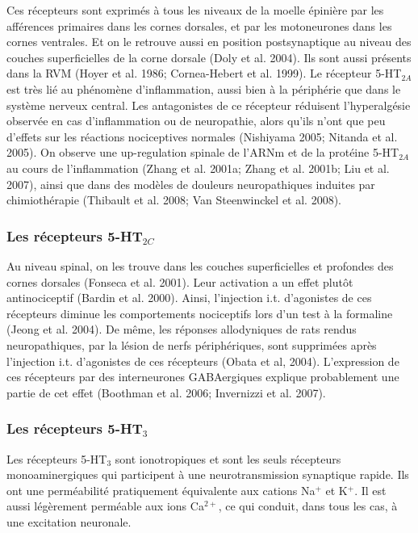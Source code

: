 \documentclass[a4paper,12pt,twoside]{report}
\begin{document}
Ces récepteurs sont exprimés à tous les niveaux de la moelle épinière par les afférences primaires dans les cornes dorsales, et par les motoneurones dans les cornes ventrales. Et on le retrouve aussi en position postsynaptique au niveau des couches superficielles de la corne dorsale (Doly et al. 2004). Ils sont aussi présents dans la RVM (Hoyer et al. 1986; Cornea-Hebert et al. 1999). Le récepteur 5-HT$_{2A}$ est très lié au phénomène d’inflammation, aussi bien à la périphérie que dans le système nerveux central. Les antagonistes de ce récepteur réduisent l’hyperalgésie observée en cas d’inflammation ou de neuropathie, alors qu’ils n’ont que peu d’effets sur les réactions nociceptives normales (Nishiyama 2005; Nitanda et al. 2005). On observe une up-regulation spinale de l’ARNm et de la protéine 5-HT$_{2A}$ au cours de l’inflammation (Zhang et al. 2001a; Zhang et al. 2001b; Liu et al. 2007), ainsi que dans des modèles de douleurs neuropathiques induites par chimiothérapie (Thibault et al. 2008; Van Steenwinckel et al. 2008).

\subsubsection{Les récepteurs 5-HT$_{2C}$}

Au niveau spinal, on les trouve dans les couches superficielles et profondes des cornes dorsales (Fonseca et al. 2001). Leur activation a un effet plutôt antinociceptif (Bardin et al. 2000). Ainsi, l’injection i.t. d’agonistes de ces récepteurs diminue les comportements nociceptifs lors d’un test à la formaline (Jeong et al. 2004). De même, les réponses allodyniques de rats rendus neuropathiques, par la lésion de nerfs périphériques, sont supprimées après l’injection i.t. d’agonistes de ces récepteurs (Obata et al, 2004). L’expression de ces récepteurs par des interneurones GABAergiques explique probablement une partie de cet effet (Boothman et al. 2006; Invernizzi et al. 2007).

\subsubsection{Les récepteurs 5-HT$_{3}$}

Les récepteurs 5-HT$_{3}$ sont ionotropiques et sont les seuls récepteurs monoaminergiques qui participent à une neurotransmission synaptique rapide. Ils ont une perméabilité pratiquement équivalente aux cations Na$^{+}$ et K$^{+}$. Il est aussi légèrement perméable aux ions Ca$^{2+}$, ce qui conduit, dans tous les cas, à une excitation neuronale.
\end{document}
